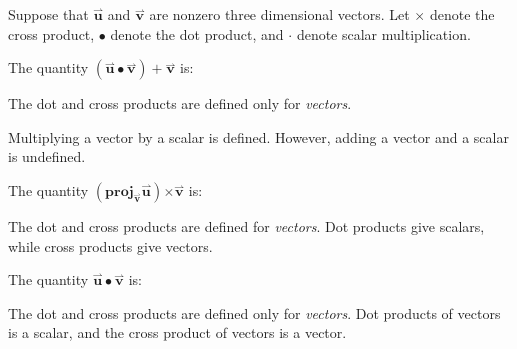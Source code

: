 \documentclass{ximera}
\author{Jim Talamo}
\begin{document}
\begin{exercise}
Suppose that $\overset{\boldsymbol{\rightharpoonup}}{\mathbf{u}} $ and $\overset{\boldsymbol{\rightharpoonup}}{\mathbf{v}} $ are nonzero three dimensional vectors.  Let $\boldsymbol\times$ denote the cross product, $\bullet$ denote the dot product, and $\cdot$ denote scalar multiplication.

The quantity $(\overset{\boldsymbol{\rightharpoonup}}{\mathbf{u}} \bullet \overset{\boldsymbol{\rightharpoonup}}{\mathbf{v}})+ \overset{\boldsymbol{\rightharpoonup}}{\mathbf{v}}$ is:

\begin{multipleChoice}
\end{multipleChoice}


\begin{hint}
The dot and cross products are defined only for \emph{vectors}.
\end{hint}

\begin{hint}
Multiplying a vector by a scalar is defined. However, adding a vector and a scalar is undefined.
\end{hint}



The quantity $(\mathbf{proj}_{\overset{\boldsymbol{\rightharpoonup}}{\mathbf{v}}} \overset{\boldsymbol{\rightharpoonup}}{\mathbf{u}}) \boldsymbol\times \overset{\boldsymbol{\rightharpoonup}}{\mathbf{v}}$ is:

\begin{multipleChoice}
\end{multipleChoice}


\begin{hint}
The dot and cross products are defined for \emph{vectors}.  Dot products give scalars, while cross products give vectors.
\end{hint}


The quantity $\overset{\boldsymbol{\rightharpoonup}}{\mathbf{u}} \bullet \overset{\boldsymbol{\rightharpoonup}}{\mathbf{v}}$ is:

\begin{multipleChoice}
\end{multipleChoice}

\begin{hint}
The dot and cross products are defined only for \emph{vectors}.  Dot products of vectors is a scalar, and the cross product of vectors is a vector.
\end{hint}



\end{exercise}
\end{document}
